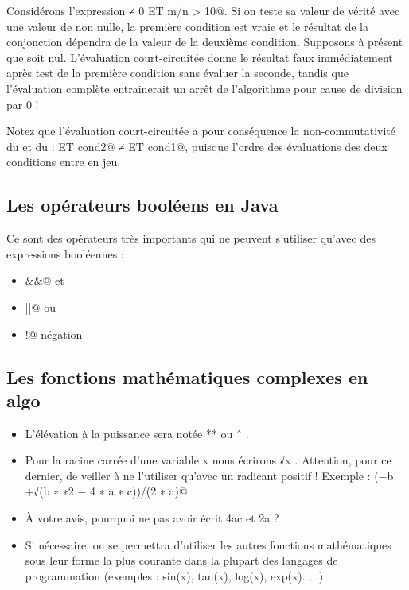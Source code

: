 \documentclass[11pt,a4paper]{article}
\begin{document}
            \par
        
          Consid\'erons l'expression \verb@n ≠ 0 ET m/n > 10@. Si on teste sa valeur
          de v\'erit\'e avec une valeur de \verb@n@ non nulle, la premi\`ere condition est vraie et le r\'esultat de
          la conjonction d\'ependra de la valeur de la deuxi\`eme condition. Supposons \`a pr\'esent que \verb@n@
          soit nul. L'\'evaluation court-circuit\'ee donne le r\'esultat faux imm\'ediatement apr\`es test de la
          premi\`ere condition sans \'evaluer la seconde, tandis que l'\'evaluation compl\`ete entrainerait un
          arr\^et de l'algorithme pour cause de division par 0 !
          
            \par
        
          Notez que l'\'evaluation court-circuit\'ee a pour cons\'equence la non-commutativit\'e du 
          \verb@ET@ et du \verb@OU@ : 
           ET cond2@ ≠  ET cond1@, 
          puisque l'ordre des \'evaluations des deux conditions entre en jeu.
          
            \par
        \subsection{Les op\'erateurs bool\'eens en Java}
          Ce sont des op\'erateurs tr\`es importants qui ne peuvent s'utiliser qu'avec des expressions bool\'eennes :
          
					\begin{itemize}
				
			\item \verb@&&@ et 
			\item \verb@||@ ou 
			\item \verb@!@ n\'egation 
					\end{itemize}
				
            \par
        \subsection{Les fonctions math\'ematiques complexes en algo}
					\begin{itemize}
				
			\item L'\'el\'evation \`a la puissance sera not\'ee ** ou ˆ . 
			\item Pour la racine carr\'ee d'une variable x nous \'ecrirons √x . Attention, pour ce dernier, de veiller \`a ne l'utiliser qu'avec un radicant positif !
            Exemple : \verb@(−b +√(b ∗ ∗2 − 4 ∗ a ∗ c))/(2 ∗ a)@
			\item  \`A votre avis, pourquoi ne pas avoir \'ecrit \guillemotleft  4ac \guillemotright  et \guillemotleft  2a \guillemotright  ?
			\item Si n\'ecessaire, on se permettra d'utiliser les autres fonctions math\'ematiques sous leur forme
            la plus courante dans la plupart des langages de programmation (exemples : sin(x), tan(x), log(x), exp(x). . .)
					\end{itemize}
				
\end{document}
